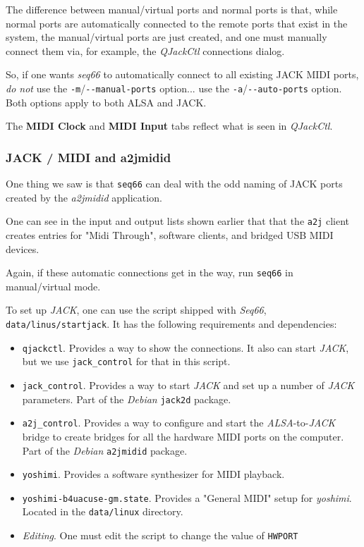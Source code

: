    The difference between manual/virtual ports and normal ports is that, while
   normal ports are automatically connected to the remote ports that exist in
   the system, the manual/virtual ports are just created, and one must
   manually connect them via, for example, the
   \textsl{QJackCtl} connections dialog.

   So, if one wants \textsl{seq66} to automatically connect to all existing
   JACK MIDI ports, \textsl{do not} use the
   \texttt{-m}/\texttt{-{}-manual-ports} option... use the
   \texttt{-a}/\texttt{-{}-auto-ports} option.  Both options apply to both
   ALSA and JACK.

   The \textbf{MIDI Clock} and \textbf{MIDI Input} tabs reflect
   what is seen in \textsl{QJackCtl}.

\subsubsection{JACK / MIDI and a2jmidid}
\label{subsubsec:jack_midi_a2jmidid}

   One thing we saw is that \texttt{seq66} can deal with the odd naming
   of JACK ports created by the \textsl{a2jmidid} application.

   One can see in the input and output lists shown earlier
   that that the \texttt{a2j} client creates entries for "Midi Through",
   software clients, and bridged USB MIDI devices.

   Again, if these automatic connections get in the way, run \texttt{seq66} in
   manual/virtual mode.

   To set up \textsl{JACK}, one can use the script shipped with
   \textsl{Seq66}, \texttt{data/linus/startjack}.  It has the following
   requirements and dependencies:

   \begin{itemize}
      \item \texttt{qjackctl}.  Provides a way to show the connections. It also
         can start \textsl{JACK}, but we use \texttt{jack\_control} for that in
         this script.
      \item \texttt{jack\_control}.  Provides a way to start \textsl{JACK}
         and set up a number of \textsl{JACK} parameters.
         Part of the \textsl{Debian} \texttt{jack2d} package.
      \item \texttt{a2j\_control}.  Provides a way to configure and start the
         \textsl{ALSA}-to-\textsl{JACK} bridge to create bridges for all the
         hardware MIDI ports on the computer.
         Part of the \textsl{Debian} \texttt{a2jmidid} package.
      \item \texttt{yoshimi}.  Provides a software synthesizer for MIDI
         playback.
      \item \texttt{yoshimi-b4uacuse-gm.state}.  Provides a "General MIDI"
      setup for \textsl{yoshimi}.  Located in the \texttt{data/linux}
      directory.
      \item \textsl{Editing}.  One must edit the script to change the value of
      \texttt{HWPORT}
   \end{itemize}

